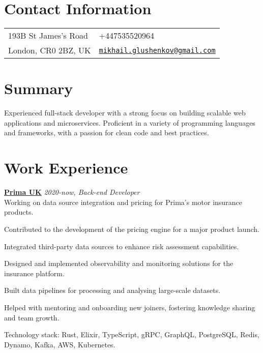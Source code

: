 \documentclass[margin,line]{res}
\begin{document}

\begin{resume}
      \section{\sc Contact Information}
      \vspace{.05in}
      \begin{tabular}{@{}p{2in}p{4in}}
            193B St James's Road &
            +447535520964                           \\
            London, CR0 2BZ, UK  &
            \href{mailto:mikhail.glushenkov@gmail.com}
            {\texttt{mikhail.glushenkov@gmail.com}} \\
      \end{tabular}

      \section{\sc Summary} Experienced full-stack developer with a strong focus
      on building scalable web applications and microservices. Proficient in a
      variety of programming languages and frameworks, with a passion for clean
      code and best practices.

      \section{\sc Work Experience}

       {\bf \href{https://helloprima.co.uk}{Prima UK}} \hfill {\it 2020-now, Back-end Developer}\\
      Working on data source integration and pricing for Prima's motor insurance
      products.\\
      \begin{list}{}{\leftmargin=1.5em}
            \item Contributed to the development of the pricing engine for a major
                  product launch.
            \item Integrated third-party data sources to enhance risk assessment
                  capabilities.
            \item Designed and implemented observability and monitoring
                  solutions for the insurance platform.
            \item Built data pipelines for processing and analysing large-scale
                  datasets.
            \item Helped with mentoring and onboarding new joiners, fostering
                  knowledge sharing and team growth.
      \end{list}
      Technology stack: Rust, Elixir, TypeScript, gRPC, GraphQL, PostgreSQL, Redis, Dynamo, Kafka, AWS, Kubernetes.


\end{resume}
\end{document}
